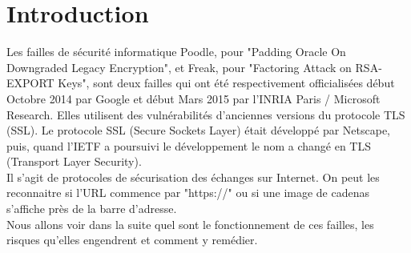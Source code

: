 \section*{Introduction}

Les failles de sécurité informatique Poodle, pour "Padding Oracle On Downgraded Legacy Encryption", et Freak, pour "Factoring Attack on RSA-EXPORT Keys", sont deux failles qui ont été respectivement officialisées début Octobre 2014 par Google et début Mars 2015 par l'INRIA Paris / Microsoft Research. Elles utilisent des vulnérabilités d'anciennes versions du protocole TLS (SSL). Le protocole SSL (Secure Sockets Layer) était développé par Netscape, puis, quand l'IETF a poursuivi le développement le nom a changé en TLS (Transport Layer Security). \\  
Il s'agit de protocoles de sécurisation des échanges sur Internet. On peut les reconnaitre si l'URL commence par "https://" ou si une image de cadenas s'affiche près de la barre d'adresse.\\ 
Nous allons voir dans la suite quel sont le fonctionnement de ces failles, les risques qu'elles engendrent et comment y remédier. 
